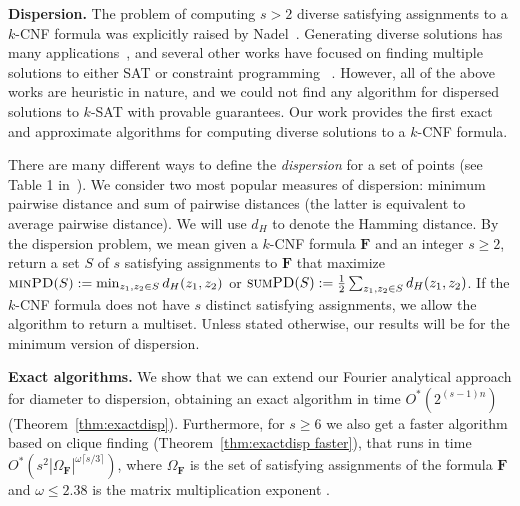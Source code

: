 \documentclass[11pt, letterpaper]{article}
\theoremstyle{definition}
\newcommand{\f}{\mathbf{F}}
\newcommand{\Om}{\Omega_{\f}}
\newcommand{\PD}{\textsc{minPD}}
\newcommand{\SPD}{\textsc{sumPD}}
\begin{document}
\noindent\textbf{Dispersion.} The problem of computing $s>2$ diverse satisfying assignments to a $k$-CNF formula was explicitly raised by Nadel~\cite{nadel2011generating}. Generating diverse solutions has many applications~\cite{baste2019fpt,abboud2022improved,bansal2010approximation}, and several other works have focused on finding multiple solutions to either SAT or constraint programming~ \cite{agbaria2010sat, petit2019enriching, hebrard2005finding, plazar2019uniform, kitchen2007stimulus, gomes2006near, arcuri2011formal}. However, all of the above works are heuristic in nature, and we could not find any algorithm for dispersed solutions to $k$-SAT with provable guarantees. Our work provides the first exact and approximate algorithms for computing diverse solutions to a $k$-CNF formula.

There are many different ways to define the \emph{dispersion} for a set of points (see Table 1 in~\cite{indyk2014composable}). We consider two most popular measures of dispersion: minimum pairwise distance and sum of pairwise distances (the latter is equivalent to average pairwise distance). We will use $d_{H}$ to denote the Hamming distance. By the dispersion problem, we mean given a $k$-CNF formula $\f$ and an integer $s \geq 2$, return a set $S$ of $s$ satisfying assignments to $\f$ that maximize $\PD(S):=\min_{z_1,z_2 \in S} d_{H}(z_1,z_2)$ or $\SPD(S):=\frac{1}{2}\sum_{z_1,z_2 \in S} d_{H}(z_1,z_2)$. If the $k$-CNF formula does not have $s$ distinct satisfying assignments, we allow the algorithm to return a multiset. Unless stated otherwise, our results will be for the minimum version of dispersion.

\vspace{1mm}\noindent\textbf{Exact algorithms.} We show that we can extend our Fourier analytical approach for diameter to dispersion, obtaining an exact algorithm in time $O^*(2^{(s-1)n})$ (Theorem~\ref{thm:exactdisp}). Furthermore, for $s \geq 6$ we also get a faster algorithm based on clique finding (Theorem~\ref{thm:exactdisp faster}), that runs in time $O^*(s^2 |\Om|^{\omega \lceil s/3 \rceil})$, where $\Om$ is the set of satisfying assignments of the formula $\f$ and $\omega\leq 2.38$ is the matrix multiplication exponent \cite{williams2024new}.
\end{document}
